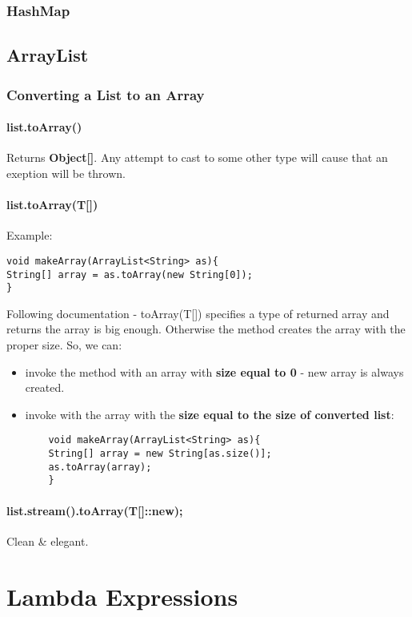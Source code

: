 \documentclass{report}
\begin{document}
\section{HashMap}

\chapter{ArrayList}
\section{Converting a List to an Array}
\subsection{list.toArray()}
Returns \textbf{Object[]}. Any attempt to cast to some other type will cause that an exeption will be thrown.

\subsection{list.toArray(T[])}
Example:
\begin{verbatim}
void makeArray(ArrayList<String> as){
String[] array = as.toArray(new String[0]);
}
\end{verbatim}

Following documentation - toArray(T[]) specifies a type of returned array and returns the array is big enough. Otherwise the method creates the array with the proper size.
So, we can:
\begin{itemize}
	\item invoke the method with an array with \textbf{size equal to 0} - new array is always created.
	\item invoke with the array with the \textbf{size equal to the size of converted list}:
	\begin{verbatim}
	void makeArray(ArrayList<String> as){
	String[] array = new String[as.size()];
	as.toArray(array);
	}
	\end{verbatim}
\end{itemize}

\subsection{list.stream().toArray(T[]::new);}
Clean \& elegant.


\part{Lambda Expressions}
\end{document}
